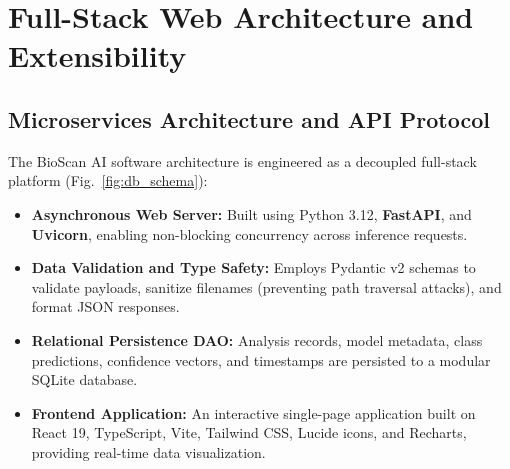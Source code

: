 \documentclass[11pt,a4paper]{article}
\begin{document}
\section{Full-Stack Web Architecture and Extensibility}

\subsection{Microservices Architecture and API Protocol}
The BioScan AI software architecture is engineered as a decoupled full-stack platform (Fig.~\ref{fig:db_schema}):
\begin{itemize}
    \item \textbf{Asynchronous Web Server:} Built using Python 3.12, \textbf{FastAPI}, and \textbf{Uvicorn}, enabling non-blocking concurrency across inference requests.
    \item \textbf{Data Validation and Type Safety:} Employs Pydantic v2 schemas to validate payloads, sanitize filenames (preventing path traversal attacks), and format JSON responses.
    \item \textbf{Relational Persistence DAO:} Analysis records, model metadata, class predictions, confidence vectors, and timestamps are persisted to a modular SQLite database.
    \item \textbf{Frontend Application:} An interactive single-page application built on React 19, TypeScript, Vite, Tailwind CSS, Lucide icons, and Recharts, providing real-time data visualization.
\end{itemize}
\end{document}
